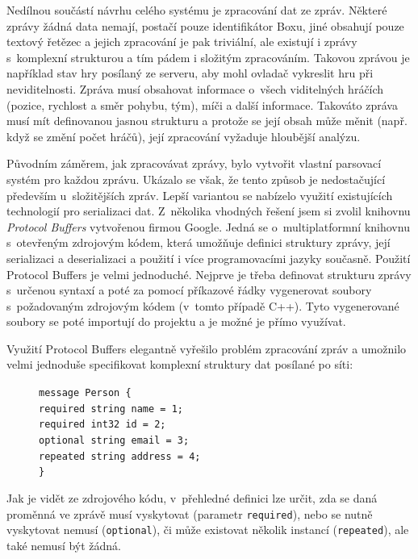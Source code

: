 \documentclass[thesis=B,czech,hidelinks]{FITthesis}[2012/06/26] %
\newcommand{\code}[1]{\texttt{#1}}
\newcommand\tab[1][1cm]{\hspace*{#1}}
\begin{document}
Nedílnou součástí návrhu celého systému je zpracování dat ze zpráv. Některé zprávy žádná data nemají, postačí pouze identifikátor Boxu, jiné obsahují pouze textový řetězec a jejich zpracování je pak triviální, ale existují i zprávy s~komplexní strukturou a tím pádem i složitým zpracováním. Takovou zprávou je například stav hry posílaný ze serveru, aby mohl ovladač vykreslit hru při neviditelnosti. Zpráva musí obsahovat informace o~všech viditelných hráčích (pozice, rychlost a směr pohybu, tým), míči a další informace. Takováto zpráva musí mít definovanou jasnou strukturu a protože se její obsah může měnit (např. když se změní počet hráčů), její zpracování vyžaduje hloubější analýzu.

Původním záměrem, jak zpracovávat zprávy, bylo vytvořit vlastní parsovací systém pro každou zprávu. Ukázalo se však, že tento způsob je nedostačující především u~složitějších zpráv. Lepší variantou se nabízelo využití existujících technologií pro serializaci dat. Z~několika vhodných řešení jsem si zvolil knihovnu \textit{Protocol Buffers} vytvořenou firmou Google. Jedná se o~multiplatformní knihovnu s~otevřeným zdrojovým kódem, která umožňuje definici struktury zprávy, její serializaci a deserializaci a použití i více programovacími jazyky současně. \cite{protobuf} Použití Protocol Buffers je velmi jednoduché. Nejprve je třeba definovat strukturu zprávy s~určenou syntaxí a poté za pomocí příkazové řádky vygenerovat soubory s~požadovaným zdrojovým kódem (v~tomto případě C++). Tyto vygenerované soubory se poté importují do projektu a je možné je přímo využívat.

Využití Protocol Buffers elegantně vyřešilo problém zpracování zpráv a umožnilo velmi jednoduše specifikovat komplexní struktury dat posílané po síti:

\begin{figure}[h]
\code{message Person \{ \\
\tab required string name = 1; \\
\tab required int32 id = 2; \\
\tab optional string email = 3; \\
\tab repeated string address = 4; \\
\}}
\end{figure}

Jak je vidět ze zdrojového kódu, v~přehledné definici lze určit, zda se daná proměnná ve zprávě musí vyskytovat (parametr \code{required}), nebo se nutně vyskytovat nemusí (\code{optional}), či může existovat několik instancí (\code{repeated}), ale také nemusí být žádná.
\end{document}
